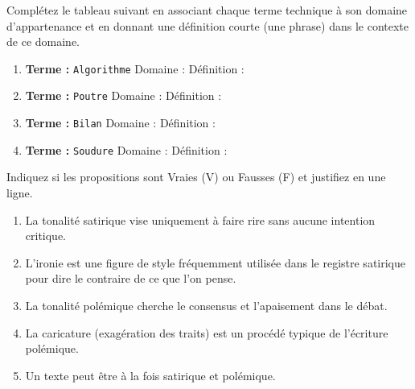 \documentclass[11pt]{article}
\begin{document}
\begin{exercice}
Complétez le tableau suivant en associant chaque terme technique à son domaine d'appartenance et en donnant une définition courte (une phrase) dans le contexte de ce domaine.
\begin{enumerate}
    \item \textbf{Terme :} \texttt{Algorithme} \quad Domaine : \underline{\hspace{5cm}} \quad Définition : \underline{\hspace{8cm}}
    \item \textbf{Terme :} \texttt{Poutre} \quad Domaine : \underline{\hspace{5cm}} \quad Définition : \underline{\hspace{8cm}}
    \item \textbf{Terme :} \texttt{Bilan} \quad Domaine : \underline{\hspace{5cm}} \quad Définition : \underline{\hspace{8cm}}
    \item \textbf{Terme :} \texttt{Soudure} \quad Domaine : \underline{\hspace{5cm}} \quad Définition : \underline{\hspace{8cm}}
\end{enumerate}
\end{exercice}

\begin{exercice}
Indiquez si les propositions sont Vraies (V) ou Fausses (F) et justifiez en une ligne.
\begin{enumerate}
    \item La tonalité satirique vise uniquement à faire rire sans aucune intention critique.
    \item L'ironie est une figure de style fréquemment utilisée dans le registre satirique pour dire le contraire de ce que l'on pense.
    \item La tonalité polémique cherche le consensus et l'apaisement dans le débat.
    \item La caricature (exagération des traits) est un procédé typique de l'écriture polémique.
    \item Un texte peut être à la fois satirique et polémique.
\end{enumerate}
\end{exercice}
\end{document}
